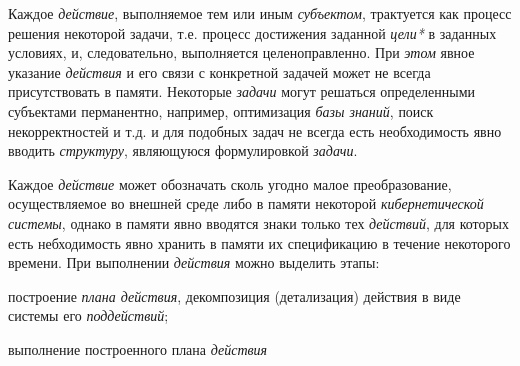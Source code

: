 \begin{SCn}
	\begin{scnindent}
	\end{scnindent}
	\begin{scnsubdividing}
	\end{scnsubdividing}

\end{SCn}

Каждое \textit{действие}, выполняемое тем или иным \textit{субъектом}, трактуется как процесс решения некоторой задачи, т.е. процесс достижения заданной \textit{цели*} в заданных условиях, и, следовательно, выполняется целеноправленно. При \textit{этом} явное указание \textit{действия} и его связи с конкретной задачей может не всегда присутствовать в памяти. Некоторые \textit{задачи} могут решаться определенными субъектами перманентно, например, оптимизация \textit{базы знаний}, поиск некорректностей и т.д. и для подобных задач не всегда есть необходимость явно вводить \textit{структуру}, являющуюся формулировкой \textit{задачи}.

Каждое \textit{действие} может обозначать сколь угодно малое преобразование, осуществляемое во внешней среде либо в памяти некоторой \textit{кибернетической системы}, однако в памяти явно вводятся знаки только тех \textit{действий}, для которых есть небходимость явно хранить в памяти их спецификацию в течение некоторого времени.
При выполнении \textit{действия} можно выделить этапы:
\begin{scnitemize}
	\item{построение \textit{плана действия}, декомпозиция (детализация) действия в виде системы его \textit{поддействий};}
	\item{выполнение построенного плана \textit{действия}}
\end{scnitemize}

